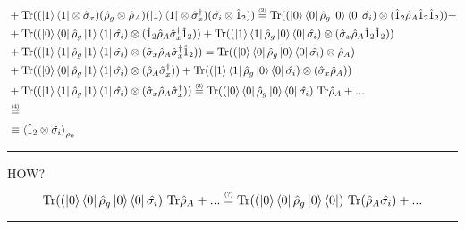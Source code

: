 \documentclass[11pt]{article}
\numberwithin{equation}{section} %
\numberwithin{figure}{section} %
\newcommand\numeq[1] %
  {\stackrel{\scriptscriptstyle(\mkern-1.5mu#1\mkern-1.5mu)}{=}}
\begin{document}
\begin{equation}
\begin{split}
&+\textrm{Tr}((\ket{1}\bra{1}\otimes\hat{\sigma}_x)(\hat{\rho}_g\otimes\hat{\rho}_A)(\ket{1}\bra{1}\otimes\hat{\sigma}_x^\dagger)(\hat{\sigma_i}\otimes\hat{1}_2))\numeq{2}\textrm{Tr}((\ket{0}\bra{0}\hat{\rho}_g\ket{0}\bra{0}\hat{\sigma_i})\otimes(\hat{1}_2\hat{\rho}_A\hat{1}_2\hat{1}_2))+\\
&+\textrm{Tr}((\ket{0}\bra{0}\hat{\rho}_g\ket{1}\bra{1}\hat{\sigma_i})\otimes(\hat{1}_2\hat{\rho}_A\hat{\sigma}_x^\dagger\hat{1}_2))+\textrm{Tr}((\ket{1}\bra{1}\hat{\rho}_g\ket{0}\bra{0}\hat{\sigma_i})\otimes(\hat{\sigma}_x \hat{\rho}_A \hat{1}_2 \hat{1}_2))\\
&+\textrm{Tr}((\ket{1}\bra{1}\hat{\rho}_g\ket{1}\bra{1}\hat{\sigma_i})\otimes(\hat{\sigma}_x \hat{\rho}_A \hat{\sigma}_x^\dagger \hat{1}_2))=\textrm{Tr}((\ket{0}\bra{0}\hat{\rho}_g\ket{0}\bra{0}\hat{\sigma_i})\otimes\hat{\rho}_A)\\
&+\textrm{Tr}((\ket{0}\bra{0}\hat{\rho}_g\ket{1}\bra{1}\hat{\sigma_i})\otimes(\hat{\rho}_A\hat{\sigma}_x^\dagger))+\textrm{Tr}((\ket{1}\bra{1}\hat{\rho}_g\ket{0}\bra{0}\hat{\sigma_i})\otimes(\hat{\sigma}_x \hat{\rho}_A))\\
&+\textrm{Tr}((\ket{1}\bra{1}\hat{\rho}_g\ket{1}\bra{1}\hat{\sigma_i})\otimes(\hat{\sigma}_x \hat{\rho}_A \hat{\sigma}_x^\dagger))\numeq{3}\textrm{Tr}((\ket{0}\bra{0}\hat{\rho}_g\ket{0}\bra{0}\hat{\sigma_i})\,\,\textrm{Tr}\hat{\rho}_A+...\\
&\numeq{4}\\
&\equiv\braket{\hat{1}_2\otimes\hat{\sigma_i}}_{\rho_0}
\end{split}
\end{equation}


\noindent
{\color{red} \rule{\linewidth}{0.5mm} }
HOW?
$$ \textrm{Tr}((\ket{0}\bra{0}\hat{\rho}_g\ket{0}\bra{0}\hat{\sigma_i})\,\,\textrm{Tr}\hat{\rho}_A+... \numeq{?} \textrm{Tr}((\ket{0}\bra{0}\hat{\rho}_g\ket{0}\bra{0})\,\,\textrm{Tr}(\hat{\rho}_A\hat{\sigma_i})+... $$
\noindent
{\color{red} \rule{\linewidth}{0.5mm} }
\end{document}
